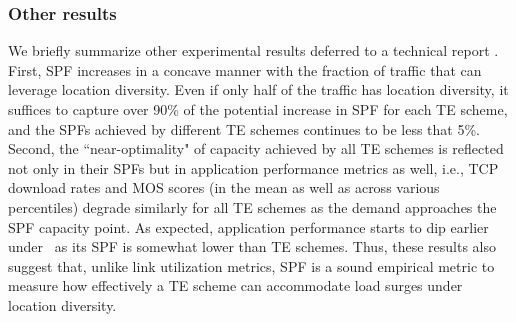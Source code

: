 \subsubsection{Other results}
We briefly summarize other experimental results deferred to a technical report \cite{TR}. First, SPF increases in a concave manner with the fraction of traffic that can leverage location diversity. Even if only half of the traffic has location diversity, it suffices to capture over 90\% of the potential increase in SPF for each TE scheme, and the SPFs achieved by different TE schemes continues to be less that 5\%. Second, the ``near-optimality" of capacity  achieved by all TE schemes is reflected not only in their SPFs but in application performance metrics as well, i.e., TCP download rates and MOS scores (in the mean as well as across various percentiles) degrade similarly for all TE schemes as the demand approaches the SPF capacity point. As expected, application performance starts to dip earlier under \invcap\ as its SPF is somewhat lower than TE schemes. Thus, these results also suggest that, unlike link utilization metrics, SPF is a sound empirical metric to measure how effectively a TE scheme can accommodate load surges under location diversity.
 






